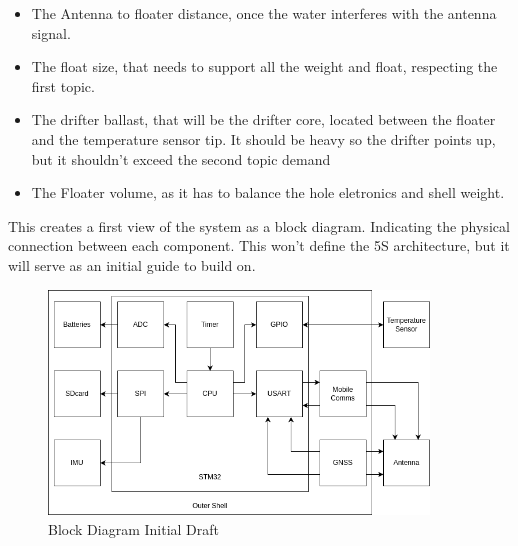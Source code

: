 \begin{itemize}
    \item The Antenna to floater distance, once the water interferes with the antenna signal.
    \item The float size, that needs to support all the weight and float, respecting the first topic.
    \item The drifter ballast, that will be the drifter core, located between the 
    floater and the temperature sensor tip. It should be heavy so the drifter points up, but it shouldn't exceed the 
    second topic demand 
    \item The Floater volume, as it has to balance the hole eletronics and shell weight.
\end{itemize}
This creates a first view of the system as a block diagram. Indicating the physical 
connection between each component. This won't define the 5S architecture, but it will serve
as an initial guide to build on.

\begin{figure}[H]
    \centering
    \includegraphics[width=0.9\textwidth]{images/diagrams/block_diagram/block_diagrams_3/blockdiagram_analysis.drawio.png}  %
    \caption{Block Diagram Initial Draft}
    \label{fig:Block Diagram Initial Draft}        
\end{figure}

